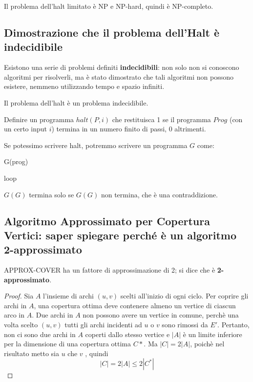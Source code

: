 \documentclass[11pt]{article}
\begin{document}
Il problema dell'halt limitato è NP e NP-hard, quindi è NP-completo.
\subsection*{Dimostrazione che il problema dell'Halt è indecidibile}
Esistono una serie di problemi definiti \textbf{indecidibili}: non solo non si conoscono algoritmi per risolverli, ma è 
stato dimostrato che tali algoritmi non possono esistere, nemmeno utilizzando tempo e spazio infiniti.

Il problema dell'halt è un problema indecidibile.

Definire un programma $halt(P,i)$ che restituisca 1 se il programma $Prog$ (con un certo input $i$) termina in un numero 
finito di passi, 0 altrimenti.

Se potessimo scrivere halt, potremmo scrivere un programma $G$ come:
\begin{algorithm}[H]
    \caption{G(prog)}
    \begin{algorithmic}
            \State loop 
        \Else{} 
        \EndIf
    \end{algorithmic}
\end{algorithm}
$G(G)$ termina solo se $G(G)$ non termina, che è una contraddizione.
\subsection*{Algoritmo Approssimato per Copertura Vertici: saper spiegare perché è un algoritmo 2-approssimato}
APPROX-COVER ha un fattore di approssimazione di 2; si dice che è \textbf{2-approssimato}.
\begin{proof}
    Sia $A$ l'insieme di archi $(u,v)$ scelti all'inizio di ogni ciclo. Per coprire gli archi in $A$, una copertura ottima 
    deve contenere almeno un vertice di ciascun arco in $A$. Due archi in $A$ non possono avere un vertice in comune, 
    perchè una volta scelto $(u,v)$ tutti gli archi incidenti ad $u$ o $v$ sono rimossi da $E'$. Pertanto, non ci sono 
    due archi in $A$ coperti dallo stesso vertice e $|A|$ è un limite inferiore per la dimensione di una copertura ottima 
    $C*$. Ma $|C|=2|A|$, poichè nel risultato metto sia $u$ che $v$ , quindi 
    \begin{equation*}
        |C|=2|A|\leq 2|C^*|
    \end{equation*}
\end{proof}
\end{document}
